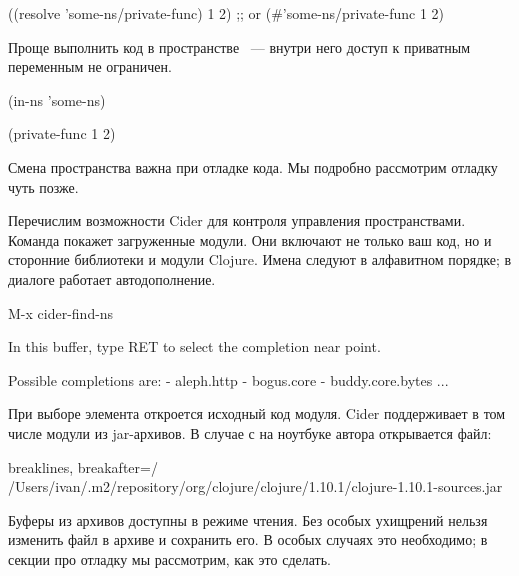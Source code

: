 \begin{english}
  \begin{clojure}
((resolve 'some-ns/private-func) 1 2)
;; or
(#'some-ns/private-func 1 2)
  \end{clojure}
\end{english}

Проще выполнить код в пространстве ~--- внутри него доступ к приватным переменным не ограничен.

\begin{english}
  \begin{clojure}
(in-ns 'some-ns)

(private-func 1 2)
  \end{clojure}
\end{english}

\pagebreaklarge

Смена пространства важна при отладке кода. Мы подробно рассмотрим отладку чуть позже.

Перечислим возможности Cider для контроля управления пространствами. Команда  покажет загруженные модули. Они включают не только ваш код, но и сторонние библиотеки и модули Clojure. Имена следуют в алфавитном порядке; в диалоге работает автодополнение.

\begin{english}
  \begin{text}
M-x cider-find-ns

In this buffer, type RET to select the completion
near point.

Possible completions are:
- aleph.http
- bogus.core
- buddy.core.bytes
...
  \end{text}
\end{english}


При выборе элемента откроется исходный код модуля. Cider поддерживает в том числе модули из jar-архивов. В случае с  на ноутбуке автора открывается файл:

\begin{english}
  \begin{text*}{breaklines, breakafter=/}
/Users/ivan/.m2/repository/org/clojure/clojure/1.10.1/clojure-1.10.1-sources.jar
  \end{text*}
\end{english}

Буферы из архивов доступны в режиме чтения. Без особых ухищрений нельзя изменить файл в архиве и сохранить его. В особых случаях это необходимо; в секции про отладку мы рассмотрим, как это сделать.

